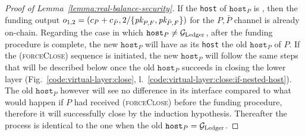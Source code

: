 \begin{proof}[Proof of Lemma~\ref{lemma:real-balance-security}]
  If the \texttt{host} of $\texttt{host}_P$ is \ledger, then the funding output
  $o_{1, 2} = (c_P + c_{\bar{P}}, 2/\{\textit{pk}_{P, F}, \textit{pk}_{\bar{P}, F}\})$ for the
  $P, \bar{P}$ channel is already on-chain. Regarding the case in which
  $\texttt{host}_P \neq \mathcal{G}_{\mathrm{Ledger}}$, after the funding procedure is complete, the
  new $\texttt{host}_P$ will have as its \texttt{host} the old $\texttt{host}_P$
  of $P$. If the (\textsc{forceClose}) sequence is initiated, the new
  $\texttt{host}_P$ will follow the same steps that will be described below once
  the old $\texttt{host}_P$ succeeds in closing the lower layer
  (Fig.~\ref{code:virtual-layer:close},
  l.~\ref{code:virtual-layer:close:if-nested-host}). The old $\texttt{host}_P$
  however will see no difference in its interface compared to what would happen
  if $P$ had received (\textsc{forceClose}) before the funding procedure, therefore
  it will successfully close by the induction hypothesis. Thereafter the process
  is identical to the one when the old $\texttt{host}_P = \mathcal{G}_{\mathrm{Ledger}}$.


\end{proof}
